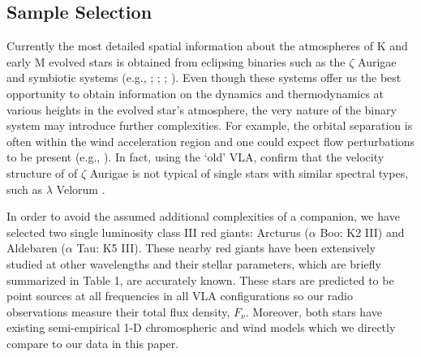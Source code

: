 \documentclass[iop]{emulateapj}
\begin{document}
\subsection{Sample Selection} \label{intro2}

Currently the most detailed spatial information about the atmospheres of K and early M evolved stars is obtained from eclipsing binaries such as the $\zeta$ Aurigae and symbiotic systems (e.g., \citealt{1970VA.....12..147W}; \citealt{1996ApJ...466..979B}; \citealt{2008AJ....136.1964E}; \citealt{2008ApJ...675..711C}). Even though these systems offer us the best opportunity to obtain information on the dynamics and thermodynamics at various heights in the evolved star's atmosphere, the very nature of the binary system may introduce further complexities. For example, the orbital separation is often within the wind acceleration region and one could expect flow perturbations to be present (e.g., \citealt{1981ApJ...248.1043C}). In fact, using the `old' VLA, \cite{2005AJ....129.1018H} confirm that the velocity structure of  of $\zeta$ Aurigae is not typical of single stars with similar spectral types, such as $\lambda$ Velorum \citep{1999ApJ...521..382C}. 

In order to avoid the assumed additional complexities of a companion, we have selected two single luminosity class III red giants: Arcturus ($\alpha$ Boo: K2 III) and Aldebaren ($\alpha$ Tau: K5 III). These nearby red giants have been extensively studied at other wavelengths and their stellar parameters, which are briefly summarized in Table 1, are accurately known. These stars are predicted to be point sources at all frequencies in all VLA configurations so our radio observations measure their total flux density, $F_{\nu}$. Moreover, both stars have existing semi-empirical 1-D chromospheric and wind models which we directly compare to our data in this paper. 
\end{document}
